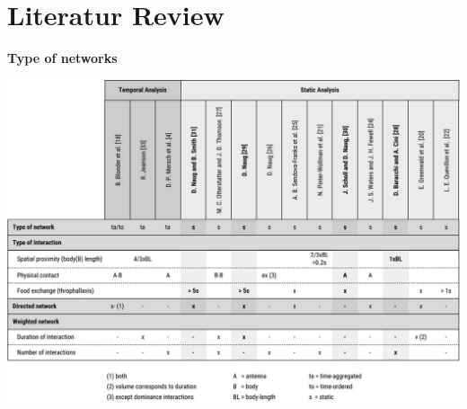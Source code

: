 \chapter{Literatur Review}
\label{ch:appendix:literatur}
\begin{table}
	\caption[Type of network]{\textbf{Type of networks}}
	\label{tab:study-nwtype}
	\vspace{3mm}
	\centering
	\includegraphics[width=1.0\textwidth]{Figures/study-nwtype}
\end{table}


